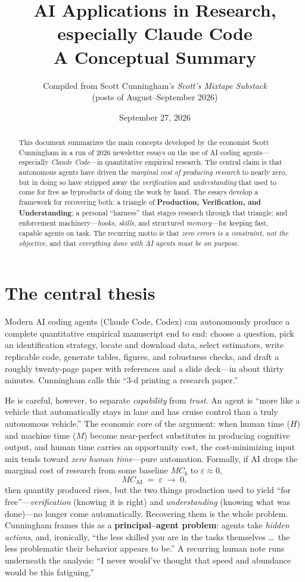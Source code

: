 \documentclass[11pt]{article}
\title{\textbf{AI Applications in Research, especially Claude Code}\\[0.4em]
\large A Conceptual Summary}
\author{Compiled from Scott Cunningham's \emph{Scott's Mixtape Substack}\\
\small (posts of August--September 2026)}
\date{September 27, 2026}
\begin{document}
\maketitle

\begin{abstract}
\noindent This document summarizes the main concepts developed by the economist
Scott Cunningham in a run of 2026 newsletter essays on the use of AI coding
agents---especially \emph{Claude Code}---in quantitative empirical research.
The central claim is that autonomous agents have driven the \emph{marginal cost
of producing research} to nearly zero, but in doing so have stripped away the
\emph{verification} and \emph{understanding} that used to come for free as
byproducts of doing the work by hand. The essays develop a framework for
recovering both: a triangle of \textbf{Production, Verification, and
Understanding}; a personal ``harness'' that stages research through that
triangle; and enforcement machinery---\emph{hooks}, \emph{skills}, and
structured \emph{memory}---for keeping fast, capable agents on task. The
recurring motto is that \emph{zero errors is a constraint, not the objective},
and that \emph{everything done with AI agents must be on purpose}.
\end{abstract}

\section{The central thesis}
Modern AI coding agents (Claude Code, Codex) can autonomously produce a complete
quantitative empirical manuscript end to end: choose a question, pick an
identification strategy, locate and download data, select estimators, write
replicable code, generate tables, figures, and robustness checks, and draft a
roughly twenty-page paper with references and a slide deck---in about thirty
minutes. Cunningham calls this ``3-d printing a research paper.''

He is careful, however, to separate \emph{capability} from \emph{trust}. An
agent is ``more like a vehicle that automatically stays in lane and has cruise
control than a truly autonomous vehicle.'' The economic core of the argument:
when human time ($H$) and machine time ($M$) become near-perfect substitutes in
producing cognitive output, and human time carries an opportunity cost, the
cost-minimizing input mix tends toward \emph{zero human time}---pure automation.
Formally, if AI drops the marginal cost of research from some baseline $MC_b$ to
$\varepsilon \approx 0$,
\[
   MC_{\text{AI}} \;=\; \varepsilon \;\longrightarrow\; 0,
\]
then quantity produced rises, but the two things production used to yield ``for
free''---\emph{verification} (knowing it is right) and \emph{understanding}
(knowing what was done)---no longer come automatically. Recovering them is the
whole problem. Cunningham frames this as a \textbf{principal--agent problem}:
agents take \emph{hidden actions}, and, ironically, ``the less skilled you are in
the tasks themselves \ldots\ the less problematic their behavior appears to be.''
A recurring human note runs underneath the analysis: ``I never would've thought
that speed and abundance would be this fatiguing.''
\end{document}
